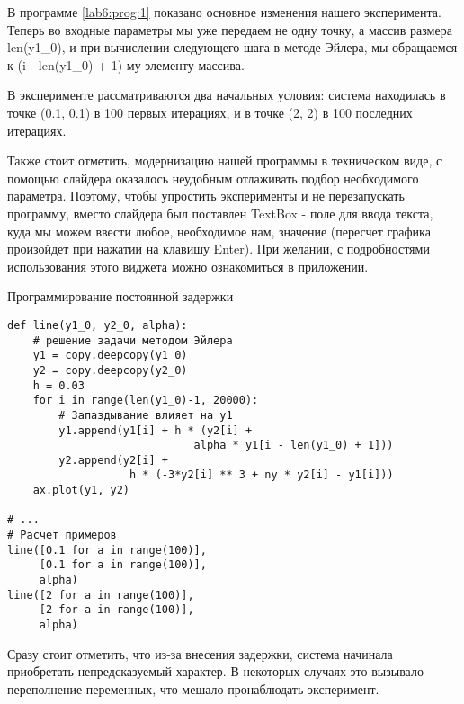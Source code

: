 В программе \ref{lab6:prog:1} показано основное изменения нашего
эксперимента. Теперь во входные параметры мы уже передаем не
одну точку, а массив размера len(y1\_0), и при вычислении следующего
шага в методе Эйлера, мы обращаемся к (i - len(y1\_0) + 1)-му элементу массива.

В эксперименте рассматриваются два начальных условия: система находилась
в точке (0.1, 0.1) в 100 первых итерациях, и в точке (2, 2) в 100 последних итерациях.

Также стоит отметить, модернизацию нашей программы в техническом виде,
с помощью слайдера оказалось неудобным отлаживать подбор необходимого параметра.
Поэтому, чтобы упростить эксперименты и не перезапускать программу, вместо
слайдера был поставлен \textmd{TextBox} - поле для ввода текста, куда мы
можем ввести любое, необходимое нам, значение (пересчет графика произойдет при нажатии на клавишу
\textmd{Enter}). При желании, с подробностями использования этого виджета можно ознакомиться
в приложении.

\begin{program}
    \caption{Программирование постоянной задержки}
    \label{lab6:prog:1}
    \begin{verbatim}
def line(y1_0, y2_0, alpha):
    # решение задачи методом Эйлера
    y1 = copy.deepcopy(y1_0)
    y2 = copy.deepcopy(y2_0)
    h = 0.03
    for i in range(len(y1_0)-1, 20000):
        # Запаздывание влияет на y1
        y1.append(y1[i] + h * (y2[i] +
                             alpha * y1[i - len(y1_0) + 1]))
        y2.append(y2[i] +
                   h * (-3*y2[i] ** 3 + ny * y2[i] - y1[i]))
    ax.plot(y1, y2)

# ...
# Расчет примеров
line([0.1 for a in range(100)],
     [0.1 for a in range(100)],
     alpha)
line([2 for a in range(100)],
     [2 for a in range(100)],
     alpha)
    \end{verbatim}
\end{program}

\clearpage

Сразу стоит отметить, что из-за внесения задержки, система начинала приобретать
непредсказуемый характер. В некоторых случаях это вызывало переполнение переменных,
что мешало пронаблюдать эксперимент.


